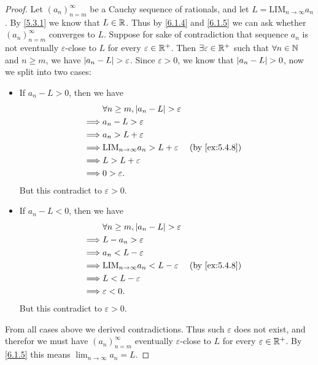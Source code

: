 \begin{proof}
  Let \((a_n)_{n = m}^\infty\) be a Cauchy sequence of rationals, and let \(L = \text{LIM}_{n \to \infty} a_n\).
  By \cref{5.3.1} we know that \(L \in \mathbb{R}\).
  Thus by \cref{6.1.4} and \cref{6.1.5} we can ask whether \((a_n)_{n = m}^\infty\) converges to \(L\).
  Suppose for sake of contradiction that sequence \(a_n\) is not eventually \(\varepsilon\)-close to \(L\) for every \(\varepsilon \in \mathbb{R}^+\).
  Then \(\exists \varepsilon \in \mathbb{R}^+\) such that \(\forall n \in \mathbb{N}\) and \(n \geq m\), we have \(\left\lvert a_n - L\right\rvert > \varepsilon\).
  Since \(\varepsilon > 0\), we know that \(\left\lvert a_n - L\right\rvert > 0\), now we split into two cases:
  \begin{itemize}
    \item If \(a_n - L > 0\), then we have
          \begin{align*}
                     & \forall n \geq m, \abs{a_n - L} > \varepsilon                      \\
            \implies & a_n - L > \varepsilon                                              \\
            \implies & a_n > L + \varepsilon                                              \\
            \implies & \text{LIM}_{n \to \infty} a_n > L + \varepsilon &  & \by{ex:5.4.8} \\
            \implies & L > L + \varepsilon                                                \\
            \implies & 0 > \varepsilon.
          \end{align*}
          But this contradict to \(\varepsilon > 0\).
    \item If \(a_n - L < 0\), then we have
          \begin{align*}
                     & \forall n \geq m, \abs{a_n - L} > \varepsilon                      \\
            \implies & L - a_n > \varepsilon                                              \\
            \implies & a_n < L - \varepsilon                                              \\
            \implies & \text{LIM}_{n \to \infty} a_n < L - \varepsilon &  & \by{ex:5.4.8} \\
            \implies & L < L - \varepsilon                                                \\
            \implies & \varepsilon < 0.
          \end{align*}
          But this contradict to \(\varepsilon > 0\).
  \end{itemize}
  From all cases above we derived contradictions.
  Thus such \(\varepsilon\) does not exist, and therefor we must have \((a_n)_{n = m}^\infty\) eventually \(\varepsilon\)-close to \(L\) for every \(\varepsilon \in \mathbb{R}^+\).
  By \cref{6.1.5} this means \(\lim_{n \to \infty} a_n = L\).
\end{proof}

